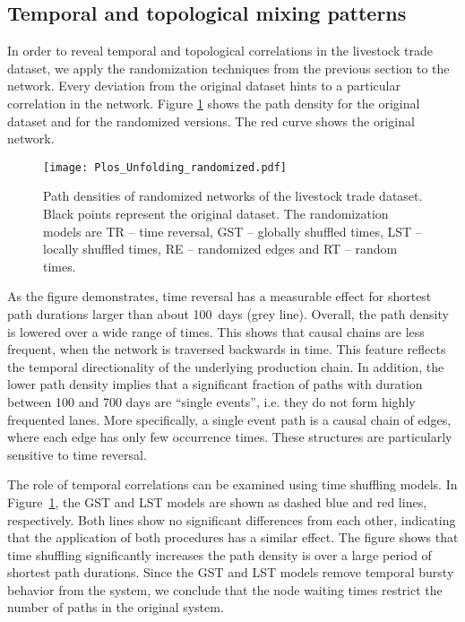\subsection{Temporal and topological mixing patterns}
In order to reveal temporal and topological correlations in the livestock trade dataset, we apply the randomization techniques from the previous section to the network.
Every deviation from the original dataset hints to a particular correlation in the network.
Figure \ref{fig:randomized_hit} shows the path density for the original dataset and for the randomized versions.
The red curve shows the original network.
\begin{figure}[htb]
\begin{center}
\texttt{[image: Plos\_Unfolding\_randomized.pdf]}
\caption{Path densities of randomized networks of the livestock trade dataset.
Black points represent the original dataset.
The randomization models are TR -- time reversal, GST -- globally shuffled times, LST -- locally shuffled times, RE -- randomized edges and RT -- random times.
}
\label{fig:randomized_hit}
\end{center}
\end{figure}

As the figure demonstrates, time reversal has a measurable effect for shortest path durations larger than about 100~days (grey line).
Overall, the path density is lowered over a wide range of times.
This shows that causal chains are less frequent, when the network is traversed backwards in time.
This feature reflects the temporal directionality of the underlying production chain.
In addition, the lower path density implies that a significant fraction of paths with duration between 100 and 700 days are ``single events'', i.e. they do not form highly frequented lanes.
More specifically, a single event path is a causal chain of edges, where each edge has only few occurrence times.
These structures are particularly sensitive to time reversal. 

The role of temporal correlations can be examined using time shuffling models.
In Figure~\ref{fig:randomized_hit}, the GST and LST models are shown as dashed blue and red lines, respectively.
Both lines show no significant differences from each other, indicating that the application of both procedures has a similar effect.
The figure shows that time shuffling significantly increases the path density is over a large period of shortest path durations.
Since the GST and LST models remove temporal bursty behavior from the system, we conclude that the node waiting times restrict the number of paths in the original system. 


